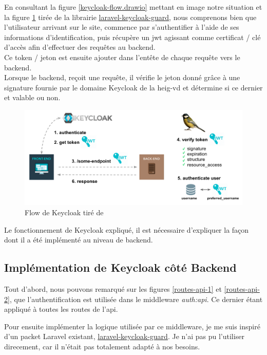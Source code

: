 \documentclass[
    iai, %
    il, %
]{heig-tb}
\begin{document}
En consultant la figure \ref{keycloak-flow.drawio} mettant en image notre situation et la figure \ref{keycloak-flow-lib} tirée de la librairie \href{https://github.com/robsontenorio/laravel-keycloak-guard}{laravel-keycloak-guard}, nous comprenons bien que l'utilisateur arrivant sur le site, commence par s'authentifier à l'aide de ses informations d'identification, puis récupère un \Gls{jwt} agissant comme certificat / clé d'accès afin d'effectuer des requêtes au \Gls{backend}. \\
Ce token / jeton est ensuite ajouter dans l'entête de chaque requête vers le \Gls{backend}. \\
Lorsque le \Gls{backend}, reçoit une requête, il vérifie le jeton donné grâce à une signature fournie par le domaine Keycloak de la \Gls{heig-vd} et détermine si ce dernier et valable ou non.

\begin{center}
    \begin{figure}[H]
        \includegraphics[width=\textwidth]{./assets/figures/keycloak-flow-lib.png}
        \caption{Flow de Keycloak tiré de \label{keycloak-flow-lib}}
    \end{figure}
\end{center}

Le fonctionnement de Keycloak expliqué, il est nécessaire d'expliquer la façon dont il a été implémenté au niveau de \Gls{backend}.

\subsection{Implémentation de Keycloak côté Backend}
Tout d'abord, nous pouvons remarqué sur les figures \ref{routes-api-1} et \ref{routes-api-2}, que l'authentification est utilisée dans le middleware \emph{auth:api}. Ce dernier étant appliqué à toutes les routes de l'\Gls{api}.

Pour ensuite implémenter la logique utilisée par ce middleware, je me suis inspiré d'un packet Laravel existant, \href{https://github.com/robsontenorio/laravel-keycloak-guard}{laravel-keycloak-guard}. Je n'ai pas pu l'utiliser direcement, car il n'était pas totalement adapté à nos besoins.
\end{document}

